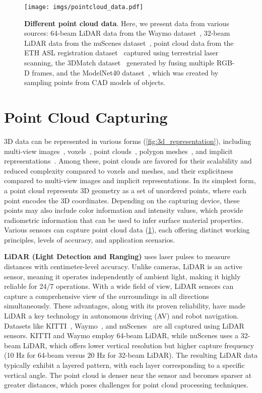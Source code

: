 \begin{figure}[t]
    \centering
    \texttt{[image: imgs/pointcloud\_data.pdf]}
    \caption{\textbf{Different point cloud data}. Here, we present data from various sources: 64-beam LiDAR data from the Waymo dataset~\cite{sun2020scalability}, 32-beam LiDAR data from the nuScenes dataset~\cite{caesar2020nuscenes}, point cloud data from the ETH ASL registration dataset~\cite{Pomerleau_2012} captured using terrestrial laser scanning, the 3DMatch dataset~\cite{zeng20163dmatch} generated by fusing multiple RGB-D frames, and the ModelNet40 dataset~\cite{wu2015ModelNet}, which was created by sampling points from CAD models of objects.}
    \label{fig:bg_pointcloud}
\end{figure}


\section{Point Cloud Capturing}
\label{sec:bg_pc_caputure}
3D data can be represented in various forms (\cf \cref{fig:3d_representation}), including multi-view images~\cite{su2015multi,qi2016volumetric}, voxels~\cite{wu20153d,maturana2015voxnet}, point clouds~\cite{qi2017pointnet,wang2019dynamic}, polygon meshes~\cite{hanocka2019meshcnn,NEURIPS2020_0a656cc1}, and implicit representations~\cite{mescheder2019occupancy,park2019deepsdf,chen2019learning,yang2021geometry}. Among these, point clouds are favored for their scalability and reduced complexity compared to voxels and meshes, and their explicitness compared to multi-view images and implicit representations. In its simplest form, a point cloud represents 3D geometry as a set of unordered points, where each point encodes the 3D coordinates. Depending on the capturing device, these points may also include color information and intensity values, which provide radiometric information that can be used to infer surface material properties. Various sensors can capture point cloud data (\cf \cref{fig:bg_pointcloud}), each offering distinct working principles, levels of accuracy, and application scenarios.

\textbf{LiDAR (Light Detection and Ranging)} uses laser pulses to measure distances with centimeter-level accuracy. Unlike cameras, LiDAR is an active sensor, meaning it operates independently of ambient light, making it highly reliable for 24/7 operations. With a wide field of view, LiDAR sensors can capture a comprehensive view of the surroundings in all directions simultaneously. These advantages, along with its proven reliability, have made LiDAR a key technology in autonomous driving (AV) and robot navigation. Datasets like KITTI~\cite{geiger2012we}, Waymo~\cite{sun2020scalability}, and nuScenes~\cite{caesar2020nuscenes} are all captured using LiDAR sensors. KITTI and Waymo employ 64-beam LiDAR, while nuScenes uses a 32-beam LiDAR, which offers lower vertical resolution but higher capture frequency (10 Hz for 64-beam versus 20 Hz for 32-beam LiDAR). The resulting LiDAR data typically exhibit a layered pattern, with each layer corresponding to a specific vertical angle. The point cloud is denser near the sensor and becomes sparser at greater distances, which poses challenges for point cloud processing techniques.

